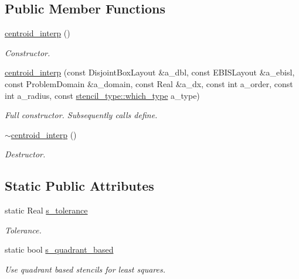\subsection*{Public Member Functions}
\begin{DoxyCompactItemize}
\item 
\hyperlink{classcentroid__interp_a451fa6dc93154d32b837944cf0d5d29b}{centroid\+\_\+interp} ()
\begin{DoxyCompactList}\small\item\em Constructor. \end{DoxyCompactList}\item 
\hyperlink{classcentroid__interp_ab3f6c6b2705607df052a1ad5c6b4a95e}{centroid\+\_\+interp} (const Disjoint\+Box\+Layout \&a\+\_\+dbl, const E\+B\+I\+S\+Layout \&a\+\_\+ebisl, const Problem\+Domain \&a\+\_\+domain, const Real \&a\+\_\+dx, const int a\+\_\+order, const int a\+\_\+radius, const \hyperlink{namespacestencil__type_a1ffed19935b7289b50e8dcc017ee99c8}{stencil\+\_\+type\+::which\+\_\+type} a\+\_\+type)
\begin{DoxyCompactList}\small\item\em Full constructor. Subsequently calls define. \end{DoxyCompactList}\item 
\hyperlink{classcentroid__interp_aedac048ad4c86ebc524b688ce93791d3}{$\sim$centroid\+\_\+interp} ()
\begin{DoxyCompactList}\small\item\em Destructor. \end{DoxyCompactList}\end{DoxyCompactItemize}
\subsection*{Static Public Attributes}
\begin{DoxyCompactItemize}
\item 
static Real \hyperlink{classcentroid__interp_aa83bc7a563431519729733f523d48edf}{s\+\_\+tolerance}
\begin{DoxyCompactList}\small\item\em Tolerance. \end{DoxyCompactList}\item 
static bool \hyperlink{classcentroid__interp_a06a8527a45ce76da5b81e2fc602aa69c}{s\+\_\+quadrant\+\_\+based}
\begin{DoxyCompactList}\small\item\em Use quadrant based stencils for least squares. \end{DoxyCompactList}\end{DoxyCompactItemize}
